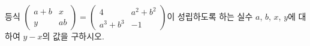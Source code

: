 \hspace*{2mm}\begin{minipage}[t]{\dimexpr\linewidth-2mm\relax}\vspace{0pt}
등식 $\begin{pmatrix} a+b & x \\ y & ab \end{pmatrix}=\begin{pmatrix} 4 & a^2+b^2 \\ a^3+b^3 & -1 \end{pmatrix}$이 성립하도록 하는 실수 $a$, $b$, $x$, $y$에 대하여 $y-x$의 값을 구하시오.\end{minipage}
